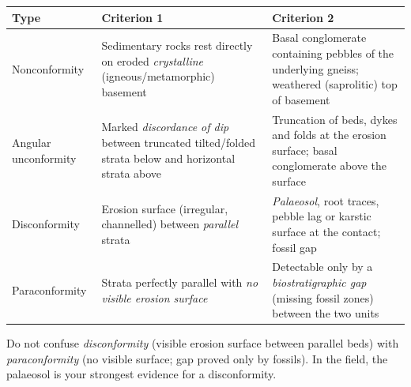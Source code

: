 \documentclass[11pt]{article}
\begin{document}
\begin{corrige}
\begin{center}
\begin{tabularx}{\linewidth}{|l|X|X|}\hline
\rowcolor{popblueL}
\textbf{Type} & \textbf{Criterion 1} & \textbf{Criterion 2} \\ \hline
Nonconformity & Sedimentary rocks rest directly on eroded \emph{crystalline} (igneous/metamorphic) basement & Basal conglomerate containing pebbles of the underlying gneiss; weathered (saprolitic) top of basement \\ \hline
Angular unconformity & Marked \emph{discordance of dip} between truncated tilted/folded strata below and horizontal strata above & Truncation of beds, dykes and folds at the erosion surface; basal conglomerate above the surface \\ \hline
Disconformity & Erosion surface (irregular, channelled) between \emph{parallel} strata & \emph{Palaeosol}, root traces, pebble lag or karstic surface at the contact; fossil gap \\ \hline
Paraconformity & Strata perfectly parallel with \emph{no visible erosion surface} & Detectable only by a \emph{biostratigraphic gap} (missing fossil zones) between the two units \\ \hline
\end{tabularx}
\end{center}

\begin{attention}
Do not confuse \emph{disconformity} (visible erosion surface between parallel beds) with \emph{paraconformity} (no visible surface; gap proved only by fossils). In the field, the palaeosol is your strongest evidence for a disconformity.
\end{attention}
\end{corrige}
\end{document}
